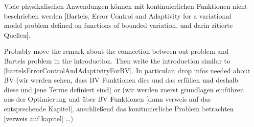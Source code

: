Viele physikalischen Anwendungen können mit kontinuierlichen Funktionen nicht
beschrieben werden [Bartels, Error Control and Adaptivity for a variational
model problem defined on functions of bounded variation, und darin zitierte
Quellen].




Probably move the remark about the connection between out problem and Bartels
problem in the introduction. Then write the introduction similar to
[bartelsErrorControlAndAdaptivityForBV].
In particular, drop infos needed about BV (wir werden sehen, dass BV Funktionen
dies und das erfüllen und deshalb diese und jene Terme definiert sind)
or (wir werden zuerst grundlagen einführen aus der Optimierung und über BV 
Funktionen [dann verweis auf das entsprechende Kapitel], anschließend
das konitnuierliche Problem betrachten [verweis auf kapitel] \ldots)

